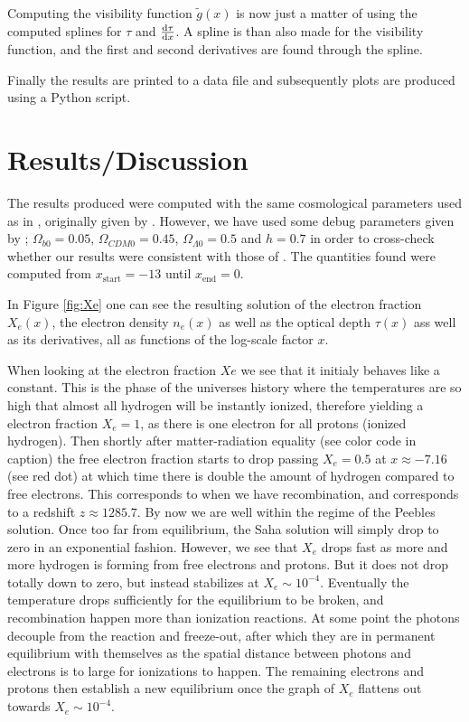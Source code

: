 \documentclass[twocolumn]{aastex62}
\begin{document}
Computing the visibility function $\tilde{g}(x)$ is now just a matter of using the computed splines for $\tau$ and $\dv{\tau}{x}$. A spline is than also made for the visibility function, and the first and second derivatives are found through the spline. 

Finally the results are printed to a data file and subsequently plots are produced using a Python script.

\section{Results/Discussion}\label{sec:Results}
The results produced were computed with the same cosmological parameters used as in \cite{stutzer:2020}, originally given by \cite{callin:2006}. However, we have used some debug parameters given by \cite{winther:2020}; $\Omega_{b0} = 0.05$, $\Omega_{CDM0} = 0.45$, $\Omega_{\Lambda 0} = 0.5$ and $h = 0.7$ in order to cross-check whether our results were consistent with those of \cite{winther:2020}. The quantities found were computed from $x_\text{start} = -13$ until $x_\text{end} = 0$.

In Figure \ref{fig:Xe} one can see the resulting solution of the electron fraction $X_e(x)$, the electron density $n_e(x)$ as well as the optical depth $\tau(x)$ ass well as its derivatives, all as functions of the log-scale factor $x$. 

When looking at the electron fraction $Xe$ we see that it initialy behaves like a constant. This is the phase of the universes history where the temperatures are so high that almost all hydrogen will be instantly ionized, therefore yielding a electron fraction $X_e = 1$, as there is one electron for all protons (ionized hydrogen). Then shortly after matter-radiation equality (see color code in caption) the free electron fraction starts to drop passing $X_e = 0.5$ at $x \approx -7.16$ (see red dot) at which time there is double the amount of hydrogen compared to free electrons. This corresponds to when we have recombination, and corresponds to a redshift $z \approx 1285.7$. By now we are well within the regime of the Peebles solution. Once too far from equilibrium, the Saha solution will simply drop to zero in an exponential fashion. However, we see that $X_e$ drops fast as more and more hydrogen is forming from free electrons and protons. But it does not drop totally down to zero, but instead stabilizes at $X_e \sim 10^{-4}$. Eventually the temperature drops sufficiently for the equilibrium to be broken, and recombination happen more than ionization reactions. At some point the photons decouple from the reaction and freeze-out, after which they are in permanent equilibrium with themselves as the spatial distance between photons and electrons is to large for ionizations to happen. The remaining electrons and protons then establish a new equilibrium once the graph of $X_e$ flattens out towards $X_e\sim 10^{-4}$.
\end{document}
